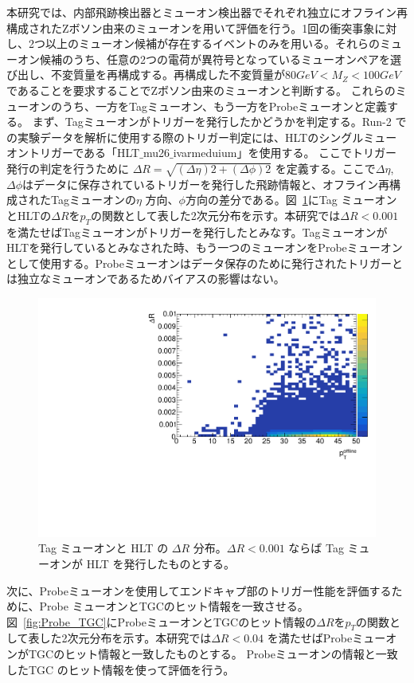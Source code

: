 本研究では、内部飛跡検出器とミューオン検出器でそれぞれ独立にオフライン再構成されたZボソン由来のミューオンを用いて評価を行う。1回の衝突事象に対し、2つ以上のミューオン候補が存在するイベントのみを用いる。それらのミューオン候補のうち、任意の2つの電荷が異符号となっているミューオンペアを選び出し、不変質量を再構成する。再構成した不変質量が$80 GeV < M_Z < 100 GeV$ であることを要求することでZボソン由来のミューオンと判断する。
これらのミューオンのうち、一方をTagミューオン、もう一方をProbeミューオンと定義する。
まず、Tagミューオンがトリガーを発行したかどうかを判定する。Run-2 での実験データを解析に使用する際のトリガー判定には、HLTのシングルミューオントリガーである「HLT$\_$mu26$\_$ivarmeduium」を使用する。
ここでトリガー発行の判定を行うために $\Delta R = \sqrt{(\Delta \eta)2 + (\Delta \phi)2}$ を定義する。ここで$\Delta \eta$, $\Delta \phi$はデータに保存されているトリガーを発行した飛跡情報と、オフライン再構成されたTagミューオンの$\eta$ 方向、$\phi$方向の差分である。図~\ref{fig:tag_HLT}にTag ミューオンとHLTの$\Delta R$を$p_T$の関数として表した2次元分布を示す。本研究では$\Delta R < 0.001$ を満たせばTagミューオンがトリガーを発行したとみなす。TagミューオンがHLTを発行しているとみなされた時、もう一つのミューオンをProbeミューオンとして使用する。Probeミューオンはデータ保存のために発行されたトリガーとは独立なミューオンであるためバイアスの影響はない。

\begin{figure}[htb]
  \centering
  \includegraphics[clip, width=12cm]{fig/3/dR_tag_HLT.pdf}
  \caption{Tag ミューオンと HLT の $\Delta R$ 分布。$\Delta R < 0.001$ ならば Tag ミューオンが HLT を発行したものとする。}
  \label{fig:tag_HLT}
\end{figure}

次に、Probeミューオンを使用してエンドキャプ部のトリガー性能を評価するために、Probe ミューオンとTGCのヒット情報を一致させる。図~\ref{fig:Probe_TGC}にProbeミューオンとTGCのヒット情報の$\Delta R$を$p_T$の関数として表した2次元分布を示す。本研究では$\Delta R < 0.04$ を満たせばProbeミューオンがTGCのヒット情報と一致したものとする。
Probeミューオンの情報と一致したTGC のヒット情報を使って評価を行う。

